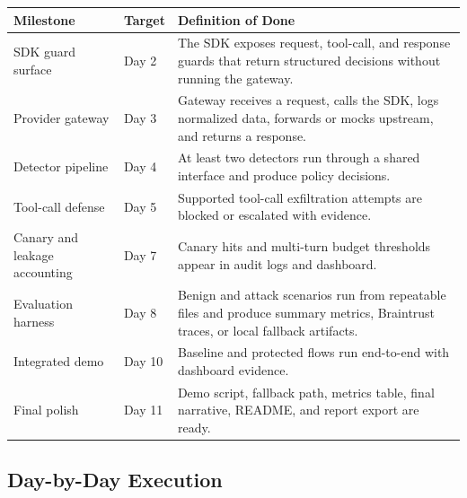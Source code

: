 \documentclass[11pt,letterpaper]{article}
\begin{document}
\begin{longtable}{p{}p{}p{}}
\toprule
\textbf{Milestone} & \textbf{Target} & \textbf{Definition of Done} \\
\midrule
SDK guard surface & Day 2 & The SDK exposes request, tool-call, and response guards that return structured decisions without running the gateway. \\
Provider gateway & Day 3 & Gateway receives a request, calls the SDK, logs normalized data, forwards or mocks upstream, and returns a response. \\
Detector pipeline & Day 4 & At least two detectors run through a shared interface and produce policy decisions. \\
Tool-call defense & Day 5 & Supported tool-call exfiltration attempts are blocked or escalated with evidence. \\
Canary and leakage accounting & Day 7 & Canary hits and multi-turn budget thresholds appear in audit logs and dashboard. \\
Evaluation harness & Day 8 & Benign and attack scenarios run from repeatable files and produce summary metrics, Braintrust traces, or local fallback artifacts. \\
Integrated demo & Day 10 & Baseline and protected flows run end-to-end with dashboard evidence. \\
Final polish & Day 11 & Demo script, fallback path, metrics table, final narrative, README, and report export are ready. \\
\bottomrule
\end{longtable}

\subsection{Day-by-Day Execution}
\end{document}
